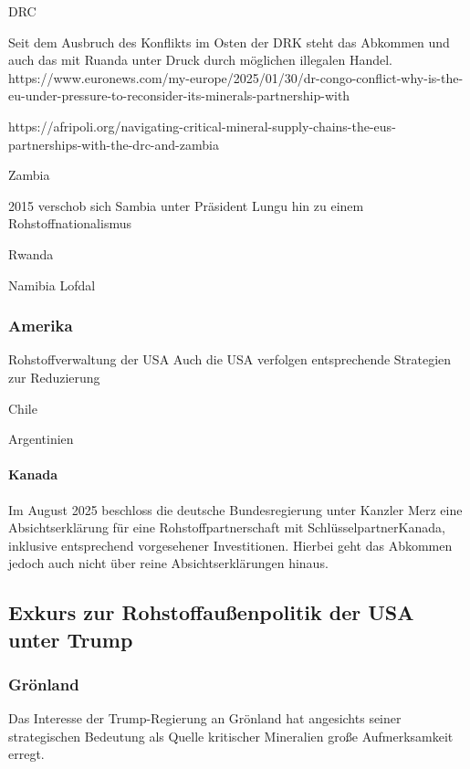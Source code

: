 \documentclass[12pt,a4paper,oneside]{book} %
\begin{document}
DRC

Seit dem Ausbruch des Konflikts im Osten der DRK steht das Abkommen und auch das mit Ruanda unter Druck durch möglichen illegalen Handel.
https://www.euronews.com/my-europe/2025/01/30/dr-congo-conflict-why-is-the-eu-under-pressure-to-reconsider-its-minerals-partnership-with

https://afripoli.org/navigating-critical-mineral-supply-chains-the-eus-partnerships-with-the-drc-and-zambia

Zambia

2015 verschob sich Sambia unter Präsident Lungu hin zu einem Rohstoffnationalismus 

Rwanda

Namibia
Lofdal 






\subsubsection{Amerika}
Rohstoffverwaltung der USA
Auch die USA verfolgen entsprechende Strategien zur Reduzierung 



Chile

Argentinien

\paragraph{Kanada}

Im August 2025 beschloss die deutsche Bundesregierung unter Kanzler Merz eine Absichtserklärung für eine Rohstoffpartnerschaft mit \glqq Schlüsselpartner\grqq Kanada, inklusive entsprechend vorgesehener Investitionen.\autocites{Stratmann, Handelsblatt, Deutschland plant Rohstoff-Deal mit Kanada}{Joint Declaration of Intent between Canada and Germany on Critical Minerals Cooperation} Hierbei geht das Abkommen jedoch auch nicht über reine Absichtserklärungen hinaus.

\subsection{Exkurs zur Rohstoffaußenpolitik der USA unter Trump}

\subsubsection{Grönland}

Das Interesse der Trump-Regierung an Grönland hat angesichts seiner strategischen Bedeutung als Quelle kritischer Mineralien große Aufmerksamkeit erregt.
\end{document}
